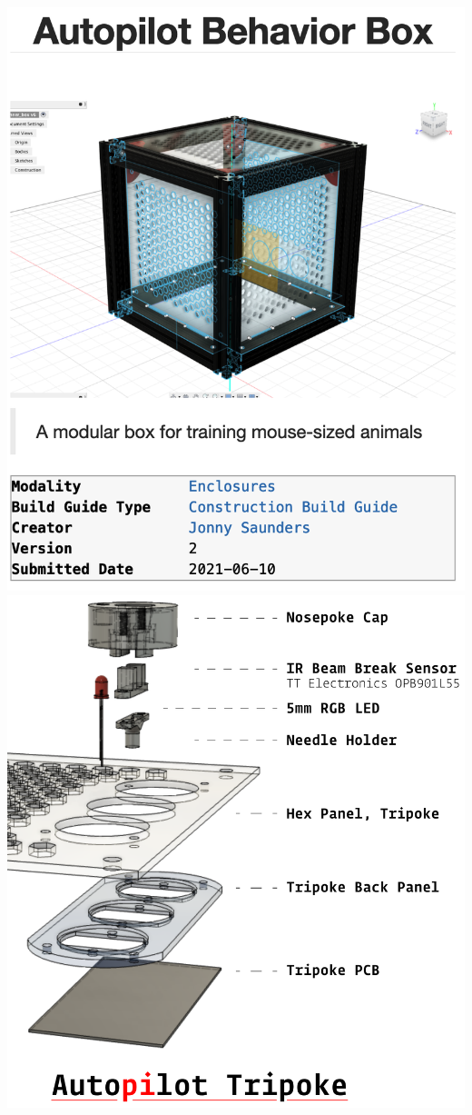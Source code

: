 \begin{marginfigure}[0cm]
\includegraphics[]{figures/behavior_box.png}
\includegraphics[]{figures/tripoke_assembly_order.pdf}

\end{marginfigure}
